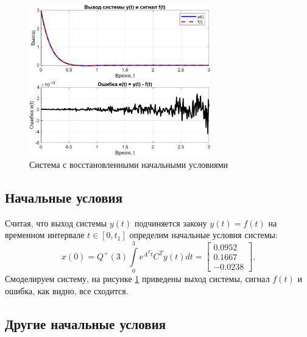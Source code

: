 \begin{figure}[H]
    \centering
    \includegraphics[width=0.7\textwidth]{figs/task_4.png}
    \caption{Система с восстановленными начальными условиями}
    \label{fig:task4}
\end{figure}

\subsection{Начальные условия}

Считая, что выход системы $y(t)$ подчиняется закону $y(t) = f (t)$ на временном
интервале $t \in [0, t_1]$ определим начальные условия системы:
\begin{equation*}
    x(0)=Q^{+}(3)\int\limits_{0}^{3}e^{A^Tt}C^Ty(t)dt
    =\begin{bmatrix}
        0.0952 \\ 0.1667 \\ -0.0238
    \end{bmatrix}.
\end{equation*}
Смоделируем систему, на рисунке \ref{fig:task4}
приведены выход системы, сигнал $f(t)$ и ошибка, как видно, все сходится.

\subsection{Другие начальные условия}

